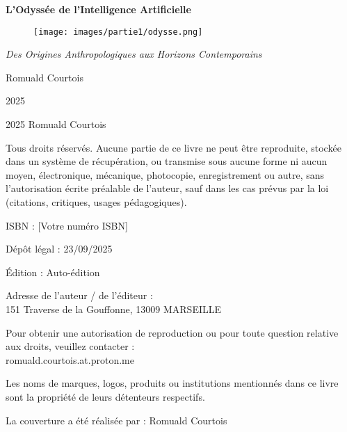 \documentclass[12pt,a4paper]{book}
\begin{document}
\begin{titlepage}
    \centering
    \vspace*{1cm}
    \Huge
    \textbf{L'Odyssée de l'Intelligence Artificielle}
    
    \begin{figure}[h]
        \centering
        \texttt{[image: images/partie1/odysse.png]}
    \end{figure}

    \vspace{0.5cm}
    
    \LARGE
    \textit{Des Origines Anthropologiques aux Horizons Contemporains}
    
    \vspace{2cm}

    \Large
    Romuald Courtois
    
    \vspace{2cm}
            
    \large
    2025

\end{titlepage}

\newpage
\pagestyle{empty}

\begin{center}
2025 Romuald Courtois

\bigskip

Tous droits réservés. Aucune partie de ce livre ne peut être reproduite, stockée dans un système de récupération, ou transmise sous aucune forme ni aucun moyen, électronique, mécanique, photocopie, enregistrement ou autre, sans l'autorisation écrite préalable de l'auteur, sauf dans les cas prévus par la loi (citations, critiques, usages pédagogiques).

\bigskip

ISBN : [Votre numéro ISBN]

\bigskip

Dépôt légal : 23/09/2025

\bigskip

Édition : Auto-édition

\bigskip

Adresse de l'auteur / de l'éditeur :\\
151 Traverse de la Gouffonne, 13009 MARSEILLE

\bigskip

Pour obtenir une autorisation de reproduction ou pour toute question relative aux droits, veuillez contacter :\\
romuald.courtois.at.proton.me

\bigskip

Les noms de marques, logos, produits ou institutions mentionnés dans ce livre sont la propriété de leurs détenteurs respectifs.

\bigskip

La couverture a été réalisée par : Romuald Courtois
\end{center}
\end{document}
